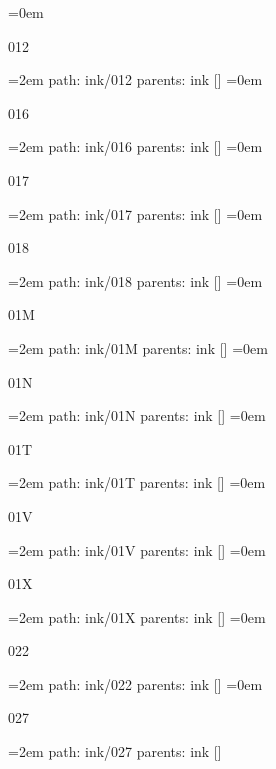\leftskip=0em
\par\endgroup
\bigskip
{}
012
\smallskip
\par\begingroup
\leftskip=2em
path: ink/012
\smallskip
parents:  ink []
\smallskip
\leftskip=0em
\par\endgroup
\bigskip
{}
016
\smallskip
\par\begingroup
\leftskip=2em
path: ink/016
\smallskip
parents:  ink []
\smallskip
\leftskip=0em
\par\endgroup
\bigskip
{}
017
\smallskip
\par\begingroup
\leftskip=2em
path: ink/017
\smallskip
parents:  ink []
\smallskip
\leftskip=0em
\par\endgroup
\bigskip
{}
018
\smallskip
\par\begingroup
\leftskip=2em
path: ink/018
\smallskip
parents:  ink []
\smallskip
\leftskip=0em
\par\endgroup
\bigskip
{}
01M
\smallskip
\par\begingroup
\leftskip=2em
path: ink/01M
\smallskip
parents:  ink []
\smallskip
\leftskip=0em
\par\endgroup
\bigskip
{}
01N
\smallskip
\par\begingroup
\leftskip=2em
path: ink/01N
\smallskip
parents:  ink []
\smallskip
\leftskip=0em
\par\endgroup
\bigskip
{}
01T
\smallskip
\par\begingroup
\leftskip=2em
path: ink/01T
\smallskip
parents:  ink []
\smallskip
\leftskip=0em
\par\endgroup
\bigskip
{}
01V
\smallskip
\par\begingroup
\leftskip=2em
path: ink/01V
\smallskip
parents:  ink []
\smallskip
\leftskip=0em
\par\endgroup
\bigskip
{}
01X
\smallskip
\par\begingroup
\leftskip=2em
path: ink/01X
\smallskip
parents:  ink []
\smallskip
\leftskip=0em
\par\endgroup
\bigskip
{}
022
\smallskip
\par\begingroup
\leftskip=2em
path: ink/022
\smallskip
parents:  ink []
\smallskip
\leftskip=0em
\par\endgroup
\bigskip
{}
027
\smallskip
\par\begingroup
\leftskip=2em
path: ink/027
\smallskip
parents:  ink []
\smallskip
